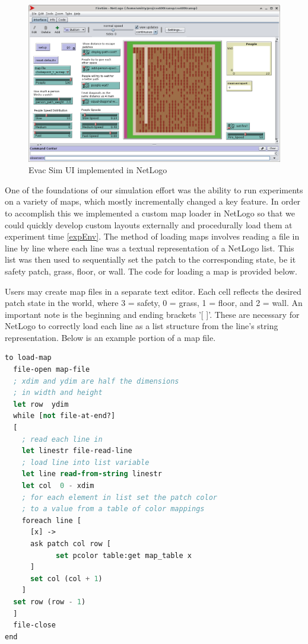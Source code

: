 \documentclass[12pt,letterpaper]{article}
\begin{document}
\begin{figure}[H]
  \centering
  \includegraphics[width=.75\linewidth]{./figures/fire_sim_ui.png}
  \caption{Evac Sim UI implemented in NetLogo}
\end{figure}

One of the foundations of our simulation effort was the ability to run experiments on a variety of maps, which mostly incrementally changed a key feature.  In order to accomplish this we implemented a custom map loader in NetLogo so that we could quickly develop custom layouts externally and procedurally load them at experiment time \ref{expEnv}.  The method of loading maps involves reading a file in line by  line where each line was a textual representation of a NetLogo list.  This list was then used to sequentially set the patch to the corresponding state, be it safety patch, grass, floor, or wall.  The code for loading a map is provided below.

Users may create map files in a separate text editor. Each cell reflects the desired patch state in the world, where 3 = safety, 0 = grass, 1 = floor, and 2 = wall. An important note is the beginning and ending brackets '[ ]'.  These are necessary for NetLogo to correctly load each line as a list structure from the line's string representation.  Below is an example portion of a map file.  


\begin{minipage}{\linewidth}
\begin{lstlisting}[language=lisp, caption={Map loading procedure in NetLogo},captionpos=b, frame=single, basicstyle=\small]
to load-map
  file-open map-file
  ; xdim and ydim are half the dimensions
  ; in width and height
  let row  ydim
  while [not file-at-end?]
  [
    ; read each line in	
    let linestr file-read-line
    ; load line into list variable
    let line read-from-string linestr
    let col  0 - xdim
    ; for each element in list set the patch color 
    ; to a value from a table of color mappings
    foreach line [      
      [x] ->
      ask patch col row [ 
            set pcolor table:get map_table x 
      ]
      set col (col + 1)
    ]
  set row (row - 1)
  ]
  file-close
end
\end{lstlisting}
\end{minipage}
\end{document}
